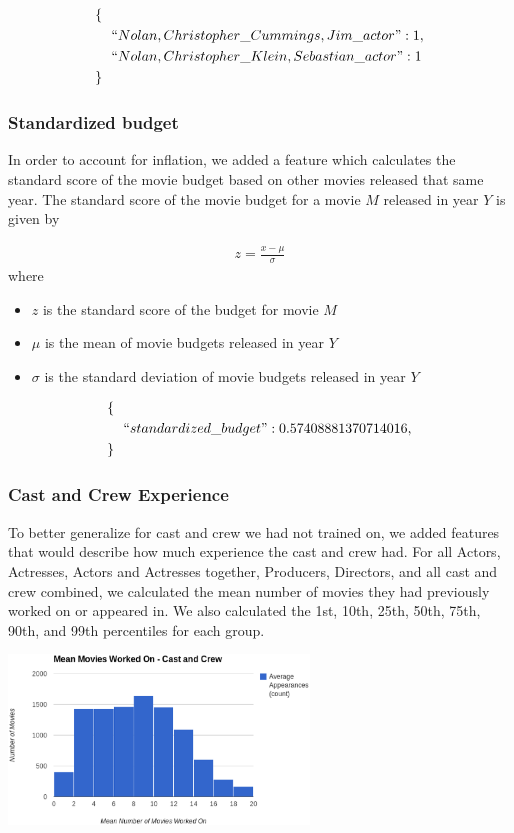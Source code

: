 \documentclass[journal]{IEEEtran}
\begin{document}
\begin{align*}
        \{\ \ &\\
        &``Nolan,Christopher\_Cummings,Jim\_actor": 1,\\
        &``Nolan,Christopher\_Klein,Sebastian\_actor": 1\\
        \}\ \ &
\end{align*}

\subsubsection{Standardized budget}
In order to account for inflation, we added a feature which calculates the
standard score of the movie budget based on other movies released that same
year.  The standard score of the movie budget for a movie $M$ released in year
$Y$ is given by

\begin{eqnarray*}
    z = \frac{x - \mu}{\sigma}
\end{eqnarray*}
where
\begin{itemize}
    \item $z$ is the standard score of the budget for movie $M$
    \item $\mu$ is the mean of movie budgets released in year $Y$
    \item $\sigma$ is the standard deviation of movie budgets released in year $Y$
\end{itemize}
\begin{align*}
        \{\ \ &\\
        &``standardized\_budget": 0.57408881370714016,\\
        \}\ \ &
\end{align*}

\subsubsection{Cast and Crew Experience}

To better generalize for cast and crew we had not trained on, we added features that would describe how much experience the cast and crew had.  For all Actors, Actresses, Actors and Actresses together, Producers, Directors, and all cast and crew combined, we calculated the mean number of movies they had previously worked on or appeared in.  We also calculated the 1st, 10th, 25th, 50th, 75th, 90th, and 99th percentiles for each group.

\includegraphics[width=8cm]{charts/appearances.eps}
\end{document}
